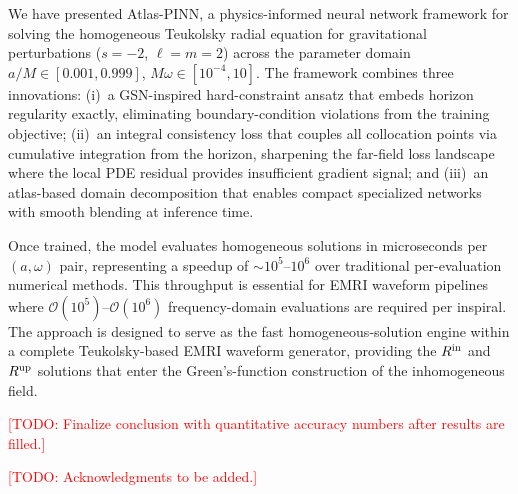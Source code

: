 \documentclass[aps,prd,twocolumn,superscriptaddress,nofootinbib]{revtex4-2}
\newcommand{\TODO}[1]{\textcolor{red}{[TODO: #1]}}
\begin{document}
We have presented Atlas-PINN, a physics-informed neural network framework for
solving the homogeneous Teukolsky radial equation for gravitational
perturbations ($s=-2$, $\ell=m=2$) across the parameter domain
$a/M \in [0.001, 0.999]$, $M\omega \in [10^{-4}, 10]$.  The framework combines
three innovations: (i)~a GSN-inspired hard-constraint ansatz that embeds horizon
regularity exactly, eliminating boundary-condition violations from the training
objective; (ii)~an integral consistency loss that couples all collocation points
via cumulative integration from the horizon, sharpening the far-field loss
landscape where the local PDE residual provides insufficient gradient signal;
and (iii)~an atlas-based domain decomposition that enables compact specialized
networks with smooth blending at inference time.

Once trained, the model evaluates homogeneous solutions in microseconds per
$(a,\omega)$ pair, representing a speedup of $\sim 10^{5}$--$10^{6}$ over
traditional per-evaluation numerical methods.  This throughput is essential for
EMRI waveform pipelines where $\mathcal{O}(10^{5})$--$\mathcal{O}(10^{6})$
frequency-domain evaluations are required per inspiral.  The approach is
designed to serve as the fast homogeneous-solution engine within a complete
Teukolsky-based EMRI waveform generator, providing the $R^{\rm in}$ and
$R^{\rm up}$ solutions that enter the Green's-function construction of the
inhomogeneous field.

\TODO{Finalize conclusion with quantitative accuracy numbers after results
are filled.}

\begin{acknowledgments}
\TODO{Acknowledgments to be added.}
\end{acknowledgments}



\end{document}
